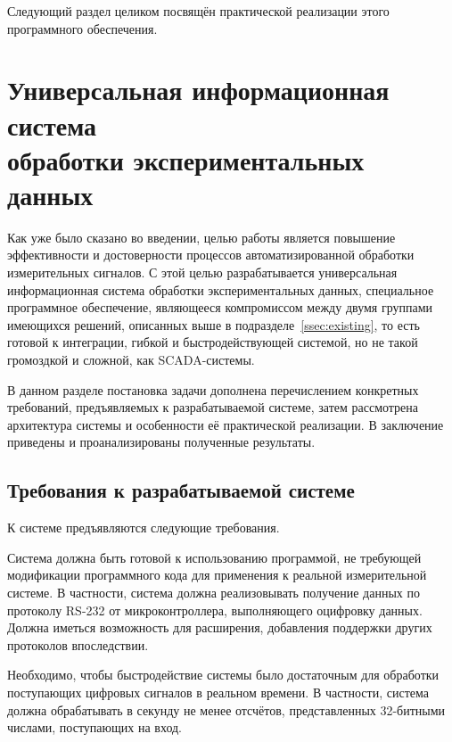 \documentclass[a4paper, 14pt, titlepage]{extarticle}
\let\oldsection\section
\renewcommand{\section}{\newpage\oldsection}
\begin{document}
  Следующий раздел целиком посвящён практической реализации этого программного обеспечения.

  \section[Универсальная информационная система обработки экспериментальных данных]%
          {Универсальная информационная система\\обработки экспериментальных данных}\label{sec:my-system}

  Как уже было сказано во введении,
  целью работы является повышение эффективности и достоверности процессов автоматизированной
  обработки измерительных сигналов. С этой целью разрабатывается универсальная информационная
  система обработки экспериментальных данных,
  специальное программное обеспечение,
  являющееся компромиссом между двумя группами имеющихся решений, описанных выше в
  подразделе~\ref{ssec:existing}, то есть готовой к интеграции, гибкой и быстродействующей системой, но не такой
  громоздкой и сложной, как SCADA-системы.

  В данном разделе постановка задачи дополнена перечислением конкретных требований, предъявляемых к
  разрабатываемой системе, затем рассмотрена архитектура системы и особенности её практической
  реализации. В заключение приведены и проанализированы полученные результаты.


  \subsection{Требования к разрабатываемой системе}\label{ssec:requirements}

  К системе предъявляются следующие требования.

  Система должна быть готовой к использованию программой, не требующей модификации программного кода
  для применения к реальной измерительной системе. В частности, система должна реализовывать
  получение данных по протоколу RS-232\cite{sweet-serial} от микроконтроллера, выполняющего оцифровку
  данных. Должна иметься возможность для расширения, добавления поддержки других протоколов впоследствии.

  Необходимо, чтобы быстродействие системы было достаточным для обработки поступающих цифровых
  сигналов в реальном времени. В частности, система должна обрабатывать в секунду не менее
   отсчётов, представленных 32-битными числами, поступающих на вход.
\end{document}
